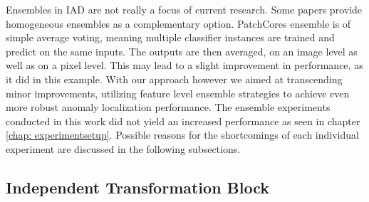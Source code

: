 Ensembles in IAD are not really a focus of current research. Some papers \cite{patchcore2022} provide homogeneous ensembles as a complementary option. 
PatchCores ensemble is of simple average voting, meaning multiple classifier instances are trained and predict on the same inputs. The outputs are then averaged, on an image level as well as on a pixel level. 
This may lead to a slight improvement in performance, as it did in this example. 
With our approach however we aimed at transcending minor improvements, utilizing feature level ensemble strategies to achieve even more robust anomaly localization performance.
The ensemble experiments conducted in this work did not yield an increased performance as seen in chapter \ref{chap: experimentsetup}. 
Possible reasons for the shortcomings of each individual experiment are discussed in the following subsections.

\subsection{Independent Transformation Block}
\label{subsec:ITBfaildiscussion}

